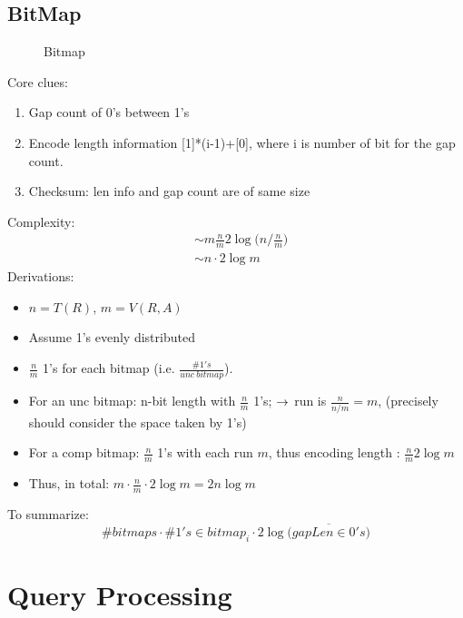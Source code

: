 \documentclass[a4paper]{report}
\begin{document}
\section{BitMap}
\begin{figure}[H]
\centering
{}
\caption{Bitmap}
\label{fig:LABEL}
\end{figure}
Core clues:
\begin{enumerate}
\item Gap count of 0's between 1's
\item Encode length information [1]*(i-1)+[0], where i is number of bit for the gap count.
\item Checksum: len info and gap count are of same size
\end{enumerate}
Complexity: 
\begin{align*}
& \sim m \frac{n}{m} 2\log\Big(n/\frac{n}{m} \Big) \\
& \sim n \cdot 2\log m 
\end{align*}
Derivations:
\begin{itemize}
\item $n = T(R)$, $m = V(R, A)$
\item Assume 1's evenly distributed 
\item $\frac{n}{m}$ 1's for each bitmap (i.e. $\frac{\#1's}{unc\ bitmap}$).
\item For an unc bitmap: n-bit length with $\frac{n}{m}$ 1's; $\rightarrow$ run is $\frac{n}{n/m}=m$, (precisely should consider the space taken by 1's)
\item For a comp bitmap: $\frac{n}{m}$ 1's with each run $m$, thus encoding length : $\frac{n}{m} 2 \log m$
\item Thus, in total: $m \cdot \frac{n}{m} \cdot 2 \log{m} = 2n\log m$
\end{itemize}

To summarize: 
$$
\#bitmaps \cdot \#1's\in bitmap_i \cdot 2\log\Big(\overline{gapLen\in 0's}\Big)
$$


\chapter{Query Processing}
\end{document}
